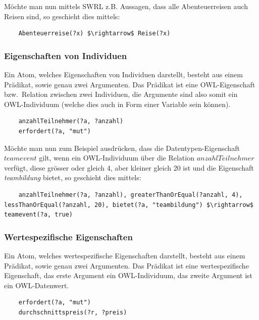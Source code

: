 Möchte man nun mittels SWRL z.B. Aussagen, dass alle Abenteuerreisen auch Reisen sind, so geschieht dies mittels:
\lstset{language=XML}
\begin{lstlisting}
    Abenteuerreise(?x) $\rightarrow$ Reise(?x)
\end{lstlisting}

\subsubsection{Eigenschaften von Individuen}
\label{ssubsec:swrl_aufbau_atomaretypen_eigenschaftenvonindividuen}
Ein Atom, welches Eigenschaften von Individuen darstellt, besteht aus einem Prädikat, sowie genau zwei Argumenten. Das Prädikat ist eine OWL-Eigenschaft bzw.\ Relation zwischen zwei Individuen, die Argumente sind also somit ein OWL-Individuum (welche dies auch in Form einer Variable sein können).
\lstset{language=XML}
\begin{lstlisting}
    anzahlTeilnehmer(?a, ?anzahl)
    erfordert(?a, "mut")
\end{lstlisting}

\newpage

Möchte man nun zum Beispiel ausdrücken, dass die Datentypen-Eigenschaft $ teamevent $ gilt, wenn ein OWL-Individuum über die Relation $ anzahlTeilnehmer $ verfügt, diese grösser oder gleich 4, aber kleiner gleich 20 ist und die Eigenschaft \textit{teambildung} bietet, so geschieht dies mittels:
\lstset{language=XML}
\begin{lstlisting}
    anzahlTeilnehmer(?a, ?anzahl), greaterThanOrEqual(?anzahl, 4), lessThanOrEqual(?anzahl, 20), bietet(?a, "teambildung") $\rightarrow$ teamevent(?a, true)
\end{lstlisting}

\subsubsection{Wertespezifische Eigenschaften}
\label{ssubsec:swrl_aufbau_atomaretypen_wertespezifischeeigenschaften}
Ein Atom, welches wertespezifische Eigenschaften darstellt, besteht aus einem Prädikat, sowie genau zwei Argumenten. Das Prädikat ist eine wertespezifische Eigenschaft, das erste Argument ein OWL-Individuum, das zweite Argument ist ein OWL-Datenwert.
\lstset{language=XML}
\begin{lstlisting}
    erfordert(?a, "mut")
    durchschnittspreis(?r, ?preis)
\end{lstlisting}


